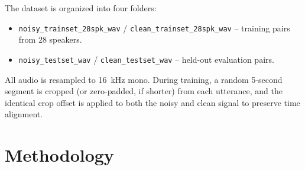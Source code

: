 \documentclass[conference]{IEEEtran}
\begin{document}
The dataset is organized into four folders:
\begin{itemize}
    \item \texttt{noisy\_trainset\_28spk\_wav} / \texttt{clean\_trainset\_28spk\_wav} -- training pairs from 28 speakers.
    \item \texttt{noisy\_testset\_wav} / \texttt{clean\_testset\_wav} -- held-out evaluation pairs.
\end{itemize}
All audio is resampled to 16~kHz mono. During training, a random 5-second segment is cropped (or zero-padded, if shorter) from each utterance, and the identical crop offset is applied to both the noisy and clean signal to preserve time alignment.

\section{Methodology}
\end{document}
